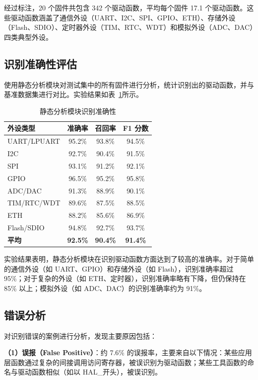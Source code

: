 经过标注，20 个固件共包含 342 个驱动函数，平均每个固件 17.1 个驱动函数。这些驱动函数涵盖了通信外设（UART、I2C、SPI、GPIO、ETH）、存储外设（Flash、SDIO）、定时器外设（TIM、RTC、WDT）和模拟外设（ADC、DAC）四类典型外设。

\subsection{识别准确性评估}

使用静态分析模块对测试集中的所有固件进行分析，统计识别出的驱动函数，并与基准数据集进行对比。实验结果如表~\ref{tab:static_results}所示。

\begin{table}[htbp]
\centering
\caption{静态分析模块识别准确性}
\label{tab:static_results}
\begin{tabular}{lccc}
\toprule
\textbf{外设类型} & \textbf{准确率} & \textbf{召回率} & \textbf{F1 分数} \\
\midrule
UART/LPUART & 95.2\% & 93.8\% & 94.5\% \\
I2C & 92.7\% & 90.4\% & 91.5\% \\
SPI & 93.1\% & 91.2\% & 92.1\% \\
GPIO & 96.5\% & 95.2\% & 95.8\% \\
ADC/DAC & 91.3\% & 88.9\% & 90.1\% \\
TIM/RTC/WDT & 89.6\% & 87.5\% & 88.5\% \\
ETH & 88.2\% & 85.6\% & 86.9\% \\
Flash/SDIO & 94.8\% & 92.7\% & 93.7\% \\
\midrule
\textbf{平均} & \textbf{92.5\%} & \textbf{90.4\%} & \textbf{91.4\%} \\
\bottomrule
\end{tabular}
\end{table}

实验结果表明，静态分析模块在识别驱动函数方面达到了较高的准确率。对于简单的通信外设（如 UART、GPIO）和存储外设（如 Flash），识别准确率超过 95\%；对于复杂的外设（如 ETH、定时器），识别准确率略有下降，但仍保持在 85\% 以上；模拟外设（如 ADC、DAC）的识别准确率约为 91\%。

\subsection{错误分析}

对识别错误的案例进行分析，发现主要原因包括：

\textbf{（1）误报（False Positive）}：约 7.6\% 的误报率，主要来自以下情况：某些应用层函数通过复杂的间接调用访问寄存器，被误识别为驱动函数；某些工具函数的命名与驱动函数相似（如以 HAL\_开头），被误识别。

